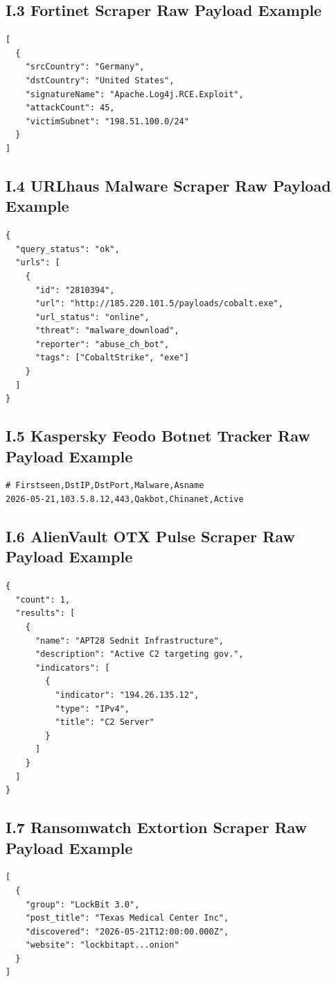 \subsection*{I.3 Fortinet Scraper Raw Payload Example}
\begin{verbatim}
[
  {
    "srcCountry": "Germany",
    "dstCountry": "United States",
    "signatureName": "Apache.Log4j.RCE.Exploit",
    "attackCount": 45,
    "victimSubnet": "198.51.100.0/24"
  }
]
\end{verbatim}

\subsection*{I.4 URLhaus Malware Scraper Raw Payload Example}
\begin{verbatim}
{
  "query_status": "ok",
  "urls": [
    {
      "id": "2810394",
      "url": "http://185.220.101.5/payloads/cobalt.exe",
      "url_status": "online",
      "threat": "malware_download",
      "reporter": "abuse_ch_bot",
      "tags": ["CobaltStrike", "exe"]
    }
  ]
}
\end{verbatim}

\subsection*{I.5 Kaspersky Feodo Botnet Tracker Raw Payload Example}
\begin{verbatim}
# Firstseen,DstIP,DstPort,Malware,Asname
2026-05-21,103.5.8.12,443,Qakbot,Chinanet,Active
\end{verbatim}

\subsection*{I.6 AlienVault OTX Pulse Scraper Raw Payload Example}
\begin{verbatim}
{
  "count": 1,
  "results": [
    {
      "name": "APT28 Sednit Infrastructure",
      "description": "Active C2 targeting gov.",
      "indicators": [
        {
          "indicator": "194.26.135.12",
          "type": "IPv4",
          "title": "C2 Server"
        }
      ]
    }
  ]
}
\end{verbatim}

\subsection*{I.7 Ransomwatch Extortion Scraper Raw Payload Example}
\begin{verbatim}
[
  {
    "group": "LockBit 3.0",
    "post_title": "Texas Medical Center Inc",
    "discovered": "2026-05-21T12:00:00.000Z",
    "website": "lockbitapt...onion"
  }
]
\end{verbatim}

